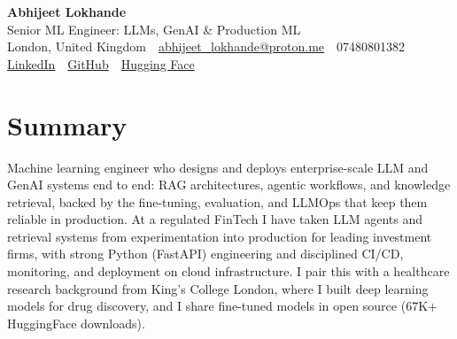 \documentclass[10pt,a4paper]{article}
\newcommand{\sep}{\,\textcolor{accent!60}{\textbar}\,}
\begin{document}
\begin{center}
  {\fontsize{24}{26}\selectfont\bfseries Abhijeet Lokhande}\\[3pt]
  {\color{accent}\large Senior ML Engineer: LLMs, GenAI \& Production ML}\\[5pt]
  {\small
    London, United Kingdom \sep
    \href{mailto:abhijeet_lokhande@proton.me}{abhijeet\_lokhande@proton.me} \sep
    07480801382 \\[2pt]
    \href{https://www.linkedin.com/in/ablds/}{LinkedIn} \sep
    \href{https://github.com/abhijeetscode}{GitHub} \sep
    \href{https://huggingface.co/ab-ai}{Hugging Face}
  }
\end{center}
\vspace{2pt}

\section{Summary}
Machine learning engineer who designs and deploys enterprise-scale LLM and GenAI systems end to end: RAG architectures, agentic workflows, and knowledge retrieval, backed by the fine-tuning, evaluation, and LLMOps that keep them reliable in production. At a regulated FinTech I have taken LLM agents and retrieval systems from experimentation into production for leading investment firms, with strong Python (FastAPI) engineering and disciplined CI/CD, monitoring, and deployment on cloud infrastructure. I pair this with a healthcare research background from King's College London, where I built deep learning models for drug discovery, and I share fine-tuned models in open source (67K+ HuggingFace downloads).

\end{document}
